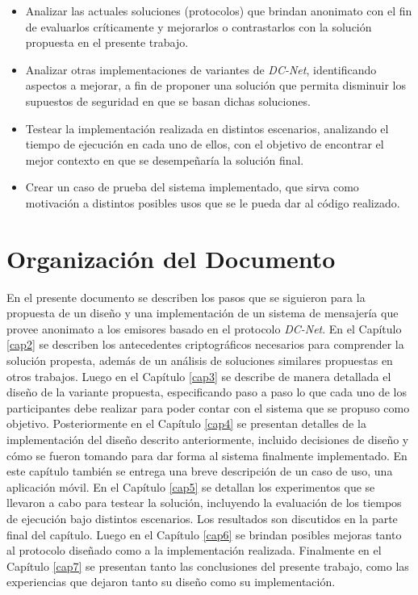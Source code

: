 \begin{itemize}
    \item Analizar las actuales soluciones (protocolos) que brindan anonimato 
    con el fin de evaluarlos críticamente y mejorarlos o contrastarlos con la 
    solución propuesta en el presente trabajo.
    \item Analizar otras implementaciones de variantes de \emph{DC-Net}, 
    identificando aspectos a mejorar, a fin de proponer una solución que 
    permita disminuir los supuestos de seguridad en que se basan dichas 
    soluciones.
    \item Testear la implementación realizada en distintos escenarios, 
    analizando el tiempo de ejecución en cada uno de ellos, con el objetivo 
    de encontrar el mejor contexto en que se desempeñaría la solución final.
    \item Crear un caso de prueba del sistema implementado, que sirva como 
    motivación a distintos posibles usos que se le pueda dar al código 
    realizado.
\end{itemize}

\section{Organización del Documento}

En el presente documento se describen los pasos que se siguieron para la 
propuesta de un diseño y una implementación de un sistema de mensajería que 
provee anonimato a los emisores basado en el protocolo \emph{DC-Net}. En el 
Capítulo \ref{cap2} se describen los antecedentes criptográficos 
necesarios para comprender la solución propesta, además de un análisis de 
soluciones similares propuestas en otros trabajos. Luego en el Capítulo 
\ref{cap3} se describe de manera detallada el diseño de la variante propuesta, 
especificando paso a paso lo que cada uno de los participantes debe realizar 
para poder contar con el sistema que se propuso como objetivo. Posteriormente 
en el Capítulo \ref{cap4} se presentan detalles de la implementación del 
diseño descrito anteriormente, incluido decisiones de diseño y cómo se fueron 
tomando para dar forma al sistema finalmente implementado. En este capítulo 
también se entrega una breve descripción de un caso de uso, una aplicación 
móvil. En el Capítulo \ref{cap5} se detallan los experimentos que se llevaron 
a cabo para testear la solución, incluyendo la evaluación de los tiempos de 
ejecución bajo distintos escenarios. Los resultados son discutidos en la parte 
final del capítulo. Luego en el Capítulo \ref{cap6} se brindan posibles 
mejoras tanto al protocolo diseñado como a la implementación realizada. 
Finalmente en el Capítulo \ref{cap7} se presentan tanto las conclusiones del 
presente trabajo, como las experiencias que dejaron tanto su diseño como su 
implementación.